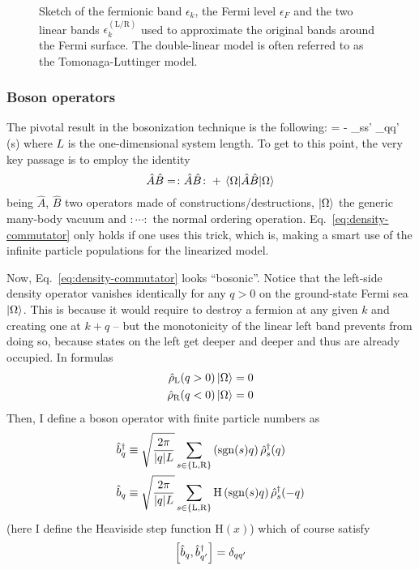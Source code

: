 \begin{figure}
	\centering
	
	\caption{Sketch of the fermionic band $\epsilon_k$, the Fermi level $\epsilon_F$ and the two linear bands $\epsilon_k^{(\mathrm{L}/\mathrm{R})}$ used to approximate the original bands around the Fermi surface. The double-linear model is often referred to as the Tomonaga-Luttinger model.}
	\label{fig:bands}
\end{figure}

\subsubsection{Boson operators}

The pivotal result in the bosonization technique is the following:
\beq\label{eq:density-commutator}
	 = - \delta_{ss'} \delta_{qq'} \sgn(s) 
\eeq
where $L$ is the one-dimensional system length.
To get to this point, the very key passage is to employ the identity
\[
	\hat A \hat B = \colon \hat A \hat B \colon + \mel{\Omega}{\hat A \hat B}{\Omega}
\]
being $\hat A$, $\hat B$ two operators made of constructions/destructions, $\ket{\Omega}$ the generic many-body vacuum and $\colon \cdots \colon$ the normal ordering operation. Eq.~\eqref{eq:density-commutator} only holds if one uses this trick, which is, making a smart use of the infinite particle populations for the linearized model.

Now, Eq.~\eqref{eq:density-commutator} looks ``bosonic''. Notice that the left-side density operator vanishes identically for any $q>0$ on the ground-state Fermi sea $\ket{\Omega}$. This is because it would require to destroy a fermion at any given $k$ and creating one at $k+q$ -- but the monotonicity of the linear left band prevents from doing so, because states on the left get deeper and deeper and thus are already occupied. In formulas
\[
\begin{aligned}
	\hat \rho_\mathrm{L} (q>0) \ket{\Omega} &= 0 \\
	\hat \rho_\mathrm{R} (q<0) \ket{\Omega} &= 0
\end{aligned}
\]
Then, I define a boson operator with finite particle numbers as
\[
\begin{aligned}
	\hat b_q^\dagger &\equiv \sqrt{\frac{2\pi}{\abs{q}L}} \sum_{s \in \left\{\mathrm L, \mathrm R\right\}}  \left(\mathrm{sgn}(s) q\right) \hat \rho_s^\dagger (q) \\
	\hat b_q &\equiv \sqrt{\frac{2\pi}{\abs{q}L}} \sum_{s \in \left\{\mathrm L, \mathrm R\right\}} \mathrm{H} \left(\mathrm{sgn}(s) q\right) \hat \rho_s^\dagger (-q)
\end{aligned}
\]
(here I define the Heaviside step function $\mathrm{H}(x)$) which of course satisfy
\[
	\comm{\hat b_q}{\hat b_{q'}^\dagger} = \delta_{qq'}
\]

